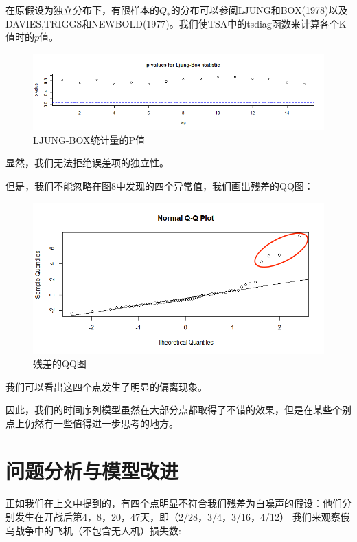 \documentclass{article}
\begin{document}
	在原假设为独立分布下，有限样本的$Q_*$的分布可以参阅LJUNG和BOX(1978)以及DAVIES,TRIGGS和NEWBOLD(1977)。我们使TSA中的tsdiag函数来计算各个K值时的$p$值。
	
		\begin{figure}[h]
		\centering
		\includegraphics[width=.9\textwidth]{Rplot10.png}
		\caption{LJUNG-BOX统计量的P值}
	\end{figure}
	
	显然，我们无法拒绝误差项的独立性。
	
	但是，我们不能忽略在图8中发现的四个异常值，我们画出残差的QQ图：
	
	
		\begin{figure}[H]
		\centering
		\includegraphics[width=.9\textwidth]{Rplot11.png}
		\caption{残差的QQ图}
	\end{figure}
	
	我们可以看出这四个点发生了明显的偏离现象。
	
	因此，我们的时间序列模型虽然在大部分点都取得了不错的效果，但是在某些个别点上仍然有一些值得进一步思考的地方。
	
	
	\section{问题分析与模型改进}
	
	
	正如我们在上文中提到的，有四个点明显不符合我们残差为白噪声的假设：他们分别发生在开战后第4，8，20，47天，即（2/28，3/4，3/16，4/12）
	我们来观察俄乌战争中的飞机（不包含无人机）损失数:
	
\end{document}
